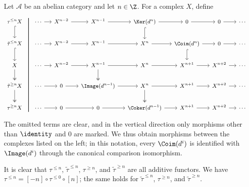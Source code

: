 \begin{definition}\label{def:truncation-cplx}
	Let $\mathcal{A}$ be an abelian category and let $n \in \Z$. For a
	complex $X$, define
	\[\begin{tikzcd}
		[column sep=small, every cell/.append style = {font = \small}]
		\tau^{\leq n} X \arrow[phantom, r, "" {name=A, yshift=2ex}] \arrow[hookrightarrow, d] & \cdots \arrow[r] & X^{n-2} \arrow[r] & X^{n-1} \arrow[r] & \Ker(d^n) \arrow[r] \arrow[hookrightarrow, d] & 0 \arrow[r] & 0 \arrow[r] & \cdots \\
		\tilde{\tau}^{\leq n} X \arrow[hookrightarrow, d] & \cdots \arrow[r] & X^{n-2} \arrow[r] & X^{n-1} \arrow[r] & X^n \arrow[r] & \Coim(d^n) \arrow[r] \arrow[hookrightarrow, d] & 0 \arrow[r] & \cdots \\
		X \arrow[twoheadrightarrow, d] & \cdots \arrow[r] & X^{n-2} \arrow[r] & X^{n-1} \arrow[r] \arrow[twoheadrightarrow, d] & X^n \arrow[r] & X^{n+1} \arrow[r] & X^{n+2} \arrow[r] & \cdots \\
		\tilde{\tau}^{\geq n} X \arrow[twoheadrightarrow, d] & \cdots \arrow[r] & 0 \arrow[r] & \Image(d^{n-1}) \arrow[r] & X^n \arrow[r] \arrow[twoheadrightarrow, d] & X^{n+1} \arrow[r] & X^{n+2} \arrow[r] & \cdots \\
		\tau^{\geq n} X \arrow[phantom, r, "" {name=B, yshift=-2ex}] & \cdots \arrow[r] & 0 \arrow[r] & 0 \arrow[r] & \Coker(d^{n-1}) \arrow[r] & X^{n+1} \arrow[r] & X^{n+2} \arrow[r] & \cdots
		\arrow[dash, thick, from=A, to=B]
	\end{tikzcd}\]
	The omitted terms are clear, and in the vertical direction only morphisms
	other than $\identity$ and $0$ are marked. We thus obtain morphisms between
	the complexes listed on the left; in this notation, every $\Coim(d^i)$ is
	identified with $\Image(d^i)$ through the canonical comparison
	isomorphism.
\end{definition}

It is clear that $\tau^{\leq n}$, $\tilde{\tau}^{\leq n}$,
$\tau^{\geq n}$, and $\tilde{\tau}^{\geq n}$ are all additive functors.
We have $\tau^{\leq n} = [-n] \circ \tau^{\leq 0} \circ [n]$; the same
holds for $\tilde{\tau}^{\leq n}$, $\tau^{\geq n}$, and
$\tilde{\tau}^{\geq n}$.

